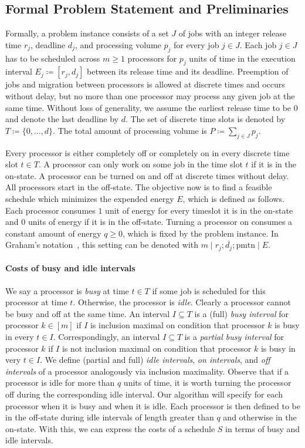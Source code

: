 \documentclass[a4paper]{article}
\begin{document}
\subsection{Formal Problem Statement and Preliminaries}
Formally, a problem instance consists of a set $J$ of jobs with an integer release time $r_j$, deadline $d_j$, and processing volume $p_j$ for every job $j \in J$.
Each job $j \in J$ has to be scheduled across $m \geq 1$ processors for $p_j$ units of time in the execution interval $E_j \coloneqq [r_j, d_j]$ between its release time and its deadline.
Preemption of jobs and migration between processors is allowed at discrete times and occurs without delay, but no more than one processor may process any given job at the same time.
Without loss of generality, we assume the earliest release time to be $0$ and denote the last deadline by $d$.
The set of discrete time slots is denoted by $T \coloneqq \{0, \ldots, d\}$.
The total amount of processing volume is $P \coloneqq \sum_{j \in J} p_j$.

Every processor is either completely off or completely on in every discrete time slot $t \in T$.
A processor can only work on some job in the time slot $t$ if it is in the on-state.
A processor can be turned on and off at discrete times without delay.
All processors start in the off-state.
The objective now is to find a feasible schedule which minimizes the expended energy $E$, which is defined as follows.
Each processor consumes $1$ unit of energy for every timeslot it is in the on-state and $0$ units of energy if it is in the off-state.
Turning a processor on consumes a constant amount of energy $q \geq 0$, which is fixed by the problem instance.
In Graham's notation~\citep{graham}, this setting can be denoted with $m \mid r_j; \overline{d_j}; \mathrm{pmtn} \mid E$.

\paragraph{Costs of busy and idle intervals}
We say a processor is \emph{busy} at time $t \in T$ if some job is scheduled for this processor at time $t$.
Otherwise, the processor is \emph{idle}.
Clearly a processor cannot be busy and off at the same time.
An interval $I \subseteq T$ is a (full) \emph{busy interval} for processor $k \in [m]$ if $I$ is inclusion maximal on condition that processor $k$ is busy in every $t \in I$.
Correspondingly, an interval $I \subseteq T$ is a \emph{partial busy interval} for processor $k$ if $I$ is not inclusion maximal on condition that processor $k$ is busy in very $t \in I$.
We define (partial and full) \emph{idle intervals}, \emph{on intervals}, and \emph{off intervals} of a processor analogously via inclusion maximality.
Observe that if a processor is idle for more than $q$ units of time, it is worth turning the processor off during the corresponding idle interval.
Our algorithm will specify for each processor when it is busy and when it is idle.
Each processor is then defined to be in the off-state during idle intervals of length greater than $q$ and otherwise in the on-state.
With this, we can express the costs of a schedule $S$ in terms of busy and idle intervals.
\end{document}
